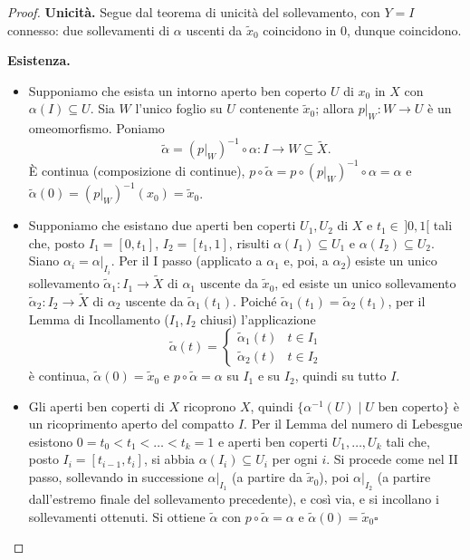 \begin{proof}
\textbf{Unicit\`a.} Segue dal teorema di unicit\`a del sollevamento, con $Y = I$ connesso: due sollevamenti di $\alpha$ uscenti da $\widetilde{x}_0$ coincidono in $0$, dunque coincidono.

\textbf{Esistenza.}
\begin{itemize}
    \item[\textbf{I passo.}] Supponiamo che esista un intorno aperto ben coperto $U$ di $x_0$ in $X$ con $\alpha(I) \subseteq U$. Sia $W$ l'unico foglio su $U$ contenente $\widetilde{x}_0$; allora $p|_W: W \to U$ \`e un omeomorfismo. Poniamo
    \[
    \widetilde{\alpha} = (p|_W)^{-1} \circ \alpha : I \to W \subseteq \widetilde{X} .
    \]
    \`E continua (composizione di continue), $p \circ \widetilde{\alpha} = p \circ (p|_W)^{-1} \circ \alpha = \alpha$ e $\widetilde{\alpha}(0) = (p|_W)^{-1}(x_0) = \widetilde{x}_0$.

    \item[\textbf{II passo.}] Supponiamo che esistano due aperti ben coperti $U_1, U_2$ di $X$ e $t_1 \in\, ]0,1[$ tali che, posto $I_1 = [0,t_1]$, $I_2 = [t_1,1]$, risulti $\alpha(I_1) \subseteq U_1$ e $\alpha(I_2) \subseteq U_2$. Siano $\alpha_i = \alpha|_{I_i}$. Per il I passo (applicato a $\alpha_1$ e, poi, a $\alpha_2$) esiste un unico sollevamento $\widetilde{\alpha}_1: I_1 \to \widetilde{X}$ di $\alpha_1$ uscente da $\widetilde{x}_0$, ed esiste un unico sollevamento $\widetilde{\alpha}_2: I_2 \to \widetilde{X}$ di $\alpha_2$ uscente da $\widetilde{\alpha}_1(t_1)$. Poich\'e $\widetilde{\alpha}_1(t_1) = \widetilde{\alpha}_2(t_1)$, per il Lemma di Incollamento ($I_1, I_2$ chiusi) l'applicazione
    \[
    \widetilde{\alpha}(t) = \begin{cases} \widetilde{\alpha}_1(t) & t \in I_1 \\ \widetilde{\alpha}_2(t) & t \in I_2 \end{cases}
    \]
    \`e continua, $\widetilde{\alpha}(0) = \widetilde{x}_0$ e $p \circ \widetilde{\alpha} = \alpha$ su $I_1$ e su $I_2$, quindi su tutto $I$.

    \item[\textbf{III passo (caso generale).}] Gli aperti ben coperti di $X$ ricoprono $X$, quindi $\{\alpha^{-1}(U) \mid U \text{ ben coperto}\}$ \`e un ricoprimento aperto del compatto $I$. Per il Lemma del numero di Lebesgue esistono $0 = t_0 < t_1 < \dots < t_k = 1$ e aperti ben coperti $U_1, \dots, U_k$ tali che, posto $I_i = [t_{i-1}, t_i]$, si abbia $\alpha(I_i) \subseteq U_i$ per ogni $i$. Si procede come nel II passo, sollevando in successione $\alpha|_{I_1}$ (a partire da $\widetilde{x}_0$), poi $\alpha|_{I_2}$ (a partire dall'estremo finale del sollevamento precedente), e cos\`i via, e si incollano i sollevamenti ottenuti. Si ottiene $\widetilde{\alpha}$ con $p \circ \widetilde{\alpha} = \alpha$ e $\widetilde{\alpha}(0) = \widetilde{x}_0$\hfill$\square$
\end{itemize}
\end{proof}

